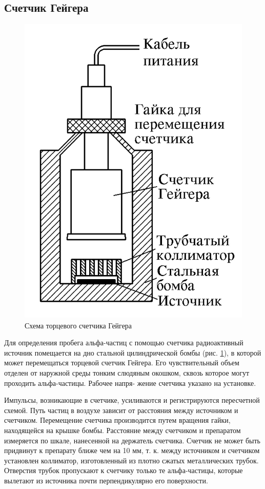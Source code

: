 \documentclass[12pt]{kiarticle}
\begin{document}
	\subsection{Счетчик Гейгера}
	
	\begin{figure}
		\includegraphics[width=\linewidth]{Geyger}
		\caption{Схема торцевого счетчика Гейгера}
		\label{ris geyger}
	\end{figure}
	
	Для определения пробега альфа-частиц с помощью счетчика радиоактивный источник помещается на дно стальной цилиндрической бомбы
	(рис. \ref{ris geyger}), в которой может перемещаться торцевой счетчик Гейгера. Его
	чувствительный объем отделен от наружной среды тонким слюдяным
	окошком, сквозь которое могут проходить альфа-частицы. Рабочее напря-
	жение счетчика указано на установке.
	
	Импульсы, возникающие в счетчике, усиливаются и регистрируются пересчетной схемой. Путь частиц в воздухе зависит от расстояния между источником и счетчиком. Перемещение счетчика производится путем вращения гайки, находящейся на крышке бомбы. Расстояние
	между счетчиком и препаратом измеряется по шкале, нанесенной на
	держатель счетчика. Счетчик не может быть придвинут к препарату ближе чем на 10 мм, т. к. между источником и счетчиком установлен коллиматор, изготовленный из плотно сжатых металлических трубок. Отверстия трубок пропускают к счетчику только те альфа-частицы, которые вылетают из источника почти перпендикулярно его поверхности.
	
\end{document}
